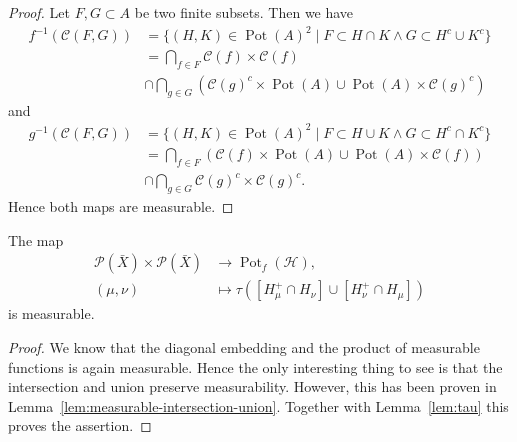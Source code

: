 \begin{proof}
  \label{lem:measurable-intersection-union}
  Let \(F, G \subset A\) be two finite subsets. Then we have
  \begin{align*}
    f^{-1}(\mathcal{C}(F,G))
    & = \{(H,K) \in \operatorname{Pot}(A)^2 \mid F \subset H \cap K \wedge G \subset H^c \cup K^c\} \\
    & = \bigcap_{f \in F} \mathcal{C}(f) \times \mathcal{C}(f)\\
    & \cap \bigcap_{g \in G} (\mathcal{C}(g)^c \times \operatorname{Pot}(A) \cup \operatorname{Pot}(A) \times \mathcal{C}(g)^c)
  \end{align*}
  and
  \begin{align*}
    g^{-1}(\mathcal{C}(F,G))
    & = \{(H,K) \in \operatorname{Pot}(A)^2 \mid F \subset H \cup K \wedge G \subset H^c \cap K^c\} \\
    & = \bigcap_{f \in F} (\mathcal{C}(f) \times \operatorname{Pot}(A) \cup \operatorname{Pot}(A) \times\mathcal{C}(f))\\
    & \cap \bigcap_{g \in G} \mathcal{C}(g)^c \times \mathcal{C}(g)^c.
  \end{align*}
  Hence both maps are measurable.
\end{proof}

\begin{lemma}
  \label{lem:measurable-tau-int}
  The map
  \begin{align*}
    \mathcal{P}(\bar X) \times \mathcal{P}(\bar X) &\to \operatorname{Pot}_f(\mathcal{H}),\\
    (\mu,\nu) &\mapsto \tau([H_\mu^+ \cap H_\nu] \cup [H_\nu^+ \cap H_\mu])
  \end{align*}
  is measurable.
\end{lemma}

\begin{proof}
  We know that the diagonal embedding and the product of measurable functions is again measurable. Hence the only interesting thing to see is that the intersection and union preserve measurability. However, this has been proven in Lemma~\ref{lem:measurable-intersection-union}. Together with Lemma~\ref{lem:tau} this proves the assertion.
\end{proof}

